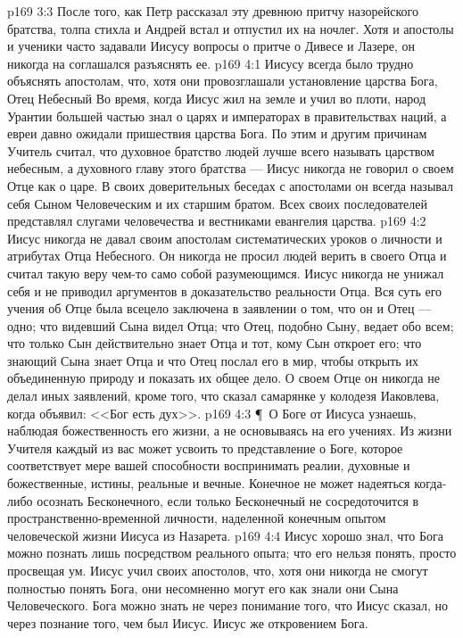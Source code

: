 \vs p169 3:3 После того, как Петр рассказал эту древнюю притчу назорейского братства, толпа стихла и Андрей встал и отпустил их на ночлег. Хотя и апостолы и ученики часто задавали Иисусу вопросы о притче о Дивесе и Лазере, он никогда на соглашался разъяснять ее.
\vs p169 4:1 Иисусу всегда было трудно объяснять апостолам, что, хотя они провозглашали установление царства Бога, Отец Небесный  Во время, когда Иисус жил на земле и учил во плоти, народ Урантии большей частью знал о царях и императорах в правительствах наций, а евреи давно ожидали пришествия царства Бога. По этим и другим причинам Учитель считал, что духовное братство людей лучше всего называть царством небесным, а духовного главу этого братства ---  Иисус никогда не говорил о своем Отце как о царе. В своих доверительных беседах с апостолами он всегда называл себя Сыном Человеческим и их старшим братом. Всех своих последователей представлял слугами человечества и вестниками евангелия царства.
\vs p169 4:2 Иисус никогда не давал своим апостолам систематических уроков о личности и атрибутах Отца Небесного. Он никогда не просил людей верить в своего Отца и считал такую веру чем\hyp{}то само собой разумеющимся. Иисус никогда не унижал себя и не приводил аргументов в доказательство реальности Отца. Вся суть его учения об Отце была всецело заключена в заявлении о том, что он и Отец --- одно; что видевший Сына видел Отца; что Отец, подобно Сыну, ведает обо всем; что только Сын действительно знает Отца и тот, кому Сын откроет его; что знающий Сына знает Отца и что Отец послал его в мир, чтобы открыть их объединенную природу и показать их общее дело. О своем Отце он никогда не делал иных заявлений, кроме того, что сказал самарянке у колодезя Иаковлева, когда объявил: <<Бог есть дух>>.
\vs p169 4:3 \P\ О Боге от Иисуса узнаешь, наблюдая божественность его жизни, а не основываясь на его учениях. Из жизни Учителя каждый из вас может усвоить то представление о Боге, которое соответствует мере вашей способности воспринимать реалии, духовные и божественные, истины, реальные и вечные. Конечное не может надеяться когда\hyp{}либо осознать Бесконечного, если только Бесконечный не сосредоточится в пространственно\hyp{}временной личности, наделенной конечным опытом человеческой жизни Иисуса из Назарета.
\vs p169 4:4 Иисус хорошо знал, что Бога можно познать лишь посредством реального опыта; что его нельзя понять, просто просвещая ум. Иисус учил своих апостолов, что, хотя они никогда не смогут полностью понять Бога, они несомненно могут его  как знали они Сына Человеческого. Бога можно знать не через понимание того, что Иисус сказал, но через познание того, чем был Иисус. Иисус же  откровением Бога.
